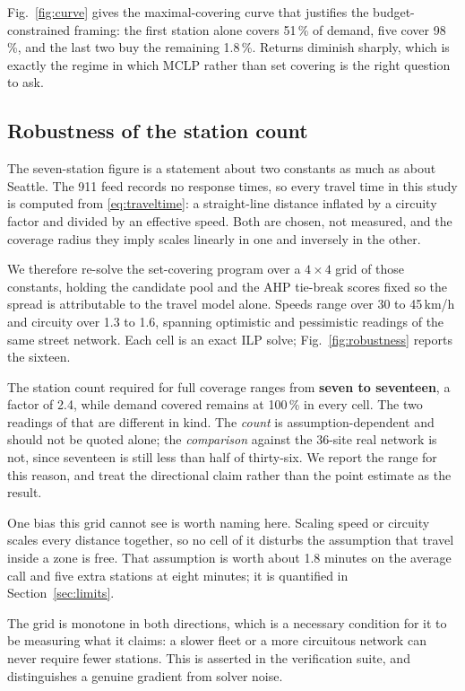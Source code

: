 \documentclass[conference]{IEEEtran}
\begin{document}
Fig.~\ref{fig:curve} gives the maximal-covering curve that justifies the
budget-constrained framing: the first station alone covers 51\,\% of demand,
five cover 98\,\%, and the last two buy the remaining 1.8\,\%. Returns diminish
sharply, which is exactly the regime in which MCLP rather than set covering is
the right question to ask.

\subsection{Robustness of the station count}
\label{sec:robustness}

The seven-station figure is a statement about two constants as much as about
Seattle. The 911 feed records no response times, so every travel time in this
study is computed from \eqref{eq:traveltime}: a straight-line distance inflated by
a circuity factor and divided by an effective speed. Both are chosen, not
measured, and the coverage radius they imply scales linearly in one and
inversely in the other.

We therefore re-solve the set-covering program over a $4\times4$ grid of those
constants, holding the candidate pool and the AHP tie-break scores fixed so the
spread is attributable to the travel model alone. Speeds range over 30 to
45\,km/h and circuity over 1.3 to 1.6, spanning optimistic and pessimistic
readings of the same street network. Each cell is an exact ILP solve;
Fig.~\ref{fig:robustness} reports the sixteen.

The station count required for full coverage ranges from \textbf{seven to
seventeen}, a factor of 2.4, while demand covered remains at 100\,\% in every
cell. The two readings of that are different in kind. The \emph{count} is
assumption-dependent and should not be quoted alone; the \emph{comparison}
against the 36-site real network is not, since seventeen is still less than
half of thirty-six. We report the range for this reason, and treat the
directional claim rather than the point estimate as the result.

One bias this grid cannot see is worth naming here. Scaling speed or circuity
scales every distance together, so no cell of it disturbs the assumption that
travel inside a zone is free. That assumption is worth about 1.8 minutes on the
average call and five extra stations at eight minutes; it is quantified in
Section~\ref{sec:limits}.

The grid is monotone in both directions, which is a necessary condition for it
to be measuring what it claims: a slower fleet or a more circuitous network can
never require fewer stations. This is asserted in the verification suite, and
distinguishes a genuine gradient from solver noise.
\end{document}
